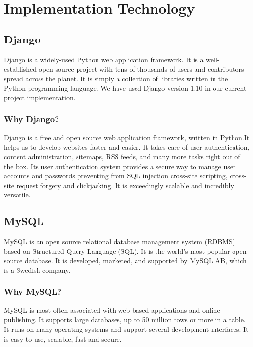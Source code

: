 \section{Implementation Technology}

\subsection{Django}

Django is a widely-used Python web application framework. It is a
well-established open source project with tens of thousands of users and
contributors spread across the planet. It is simply a collection of libraries
written in the Python programming language. We have used Django version 1.10 in
our current project implementation.

\subsubsection{Why Django?}

Django is a free and open source web application framework,
written in Python.It helps us to develop websites faster and easier. It takes
care of user authentication, content administration, sitemaps, RSS feeds, and
many more tasks right out of the box.  Its user authentication system
provides a secure way to manage user accounts and passwords preventing from SQL
injection cross-site scripting, cross-site request forgery and clickjacking. It
is exceedingly scalable and incredibly versatile.

\subsection{MySQL}

MySQL is an open source relational database management
system (RDBMS) based on Structured Query Language (SQL). It is the world's most
popular open source database. It is developed, marketed, and supported by MySQL
AB, which is a Swedish company.

\subsubsection{Why MySQL?}

MySQL is most often associated with web-based
applications and online publishing. It supports large databases, up to 50
million rows or more in a table. It runs on many operating systems and
support several development interfaces. It is easy to use, scalable, fast and
secure.

